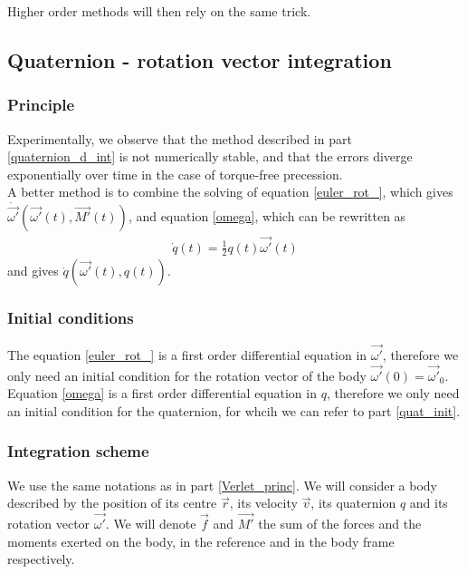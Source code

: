 \documentclass[class=report, float=false, crop=false]{standalone}
\begin{document}
Higher order methods will then rely on the same trick.

\subsection{Quaternion - rotation vector integration}

\subsubsection{Principle}

Experimentally, we observe that the method described in part \ref{quaternion_d_int} is not numerically stable, and that the errors diverge exponentially over time in the case of torque-free precession.\\

A better method is to combine the solving of equation \ref{euler_rot_}, which gives $\dot{\vec{\omega'}}(\vec{\omega'}(t),\vec{M'}(t))$, and equation \ref{omega}, which can be rewritten as
\begin{align*}
\dot{q}(t) = \frac{1}{2}q(t)\vec{\omega'}(t)
\end{align*}
and gives $\dot{q}(\vec{\omega'}(t),q(t))$.

\subsubsection{Initial conditions}

The equation \ref{euler_rot_} is a first order differential equation in $\vec{\omega'}$, therefore we only need an initial condition for the rotation vector of the body $\boxed{\vec{\omega'}(0) = \vec{\omega'}_0}$.\\

Equation \ref{omega} is a first order differential equation in $q$, therefore we only need an initial condition for the quaternion, for whcih we can refer to part \ref{quat_init}.

\subsubsection{Integration scheme}

We use the same notations as in part \ref{Verlet_princ}. We will consider a body described by the position of its centre $\vec{r}$, its velocity $\vec{v}$, its quaternion $q$ and its rotation vector $\vec{\omega'}$. We will denote $\vec{f}$ and $\vec{M'}$ the sum of the forces and the moments exerted on the body, in the reference and in the body frame respectively.\\
\end{document}
